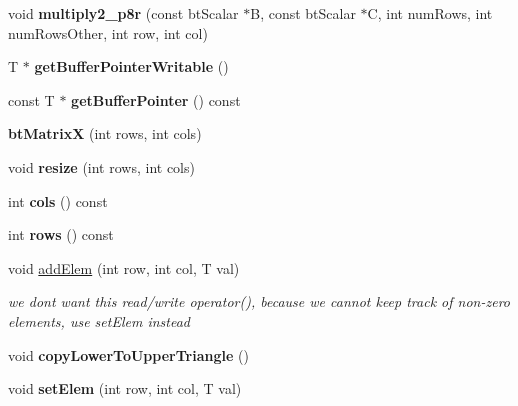 \begin{DoxyCompactItemize}
void {\bfseries multiply2\+\_\+p8r} (const bt\+Scalar $\ast$B, const bt\+Scalar $\ast$C, int num\+Rows, int num\+Rows\+Other, int row, int col)
\item 
\mbox{\label{structbtMatrixX_a828ae1f28a7714f41ba8b9ed77d1b82e}} 
T $\ast$ {\bfseries get\+Buffer\+Pointer\+Writable} ()
\item 
\mbox{\label{structbtMatrixX_af39a43b82cf3efef108f6d550529d179}} 
const T $\ast$ {\bfseries get\+Buffer\+Pointer} () const
\item 
\mbox{\label{structbtMatrixX_a5d3e06cd318ece61cd8d9d487d1b0981}} 
{\bfseries bt\+MatrixX} (int rows, int cols)
\item 
\mbox{\label{structbtMatrixX_ad39611ae18fe6a6a60f5c79e805783e8}} 
void {\bfseries resize} (int rows, int cols)
\item 
\mbox{\label{structbtMatrixX_ab543c26ea991d5250e5d38790011599c}} 
int {\bfseries cols} () const
\item 
\mbox{\label{structbtMatrixX_a2b6e9700749302129343a901aac7a37f}} 
int {\bfseries rows} () const
\item 
\mbox{\label{structbtMatrixX_a9aa5ce8e2740582ed5c5652d7581b2e7}} 
void \hyperlink{structbtMatrixX_a9aa5ce8e2740582ed5c5652d7581b2e7}{add\+Elem} (int row, int col, T val)
\begin{DoxyCompactList}\small\item\em we don\textquotesingle{}t want this read/write operator(), because we cannot keep track of non-\/zero elements, use set\+Elem instead \end{DoxyCompactList}\item 
\mbox{\label{structbtMatrixX_aba97721ed1938421c146bdb61c917b90}} 
void {\bfseries copy\+Lower\+To\+Upper\+Triangle} ()
\item 
\mbox{\label{structbtMatrixX_ae856c34a8c61142e406f2e953c84eb0d}} 
void {\bfseries set\+Elem} (int row, int col, T val)
\item 
\mbox{\label{structbtMatrixX_a90c43d67b689b87b190c3a5f77799e54}} 

\end{DoxyCompactItemize}

